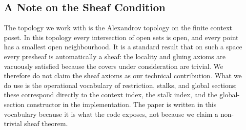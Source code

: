 \subsection{A Note on the Sheaf Condition}
\label{sec:sheaf-remark}

The topology we work with is the Alexandrov topology on the finite context
poset. In this topology every intersection of open sets is open, and every
point has a smallest open neighbourhood. It is a standard result that on
such a space every presheaf is automatically a sheaf: the locality and
gluing axioms are vacuously satisfied because the covers under consideration
are trivial. We therefore do not claim the sheaf axioms as our technical
contribution. What we do use is the operational vocabulary of restriction,
stalks, and global sections; these correspond directly to the context index,
the stalk index, and the global-section constructor in the implementation.
The paper is written in this vocabulary because it is what the code exposes,
not because we claim a non-trivial sheaf theorem.
